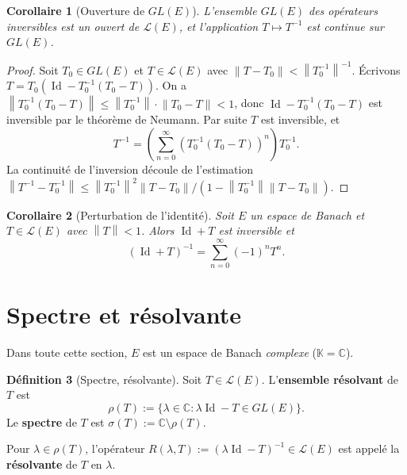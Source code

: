 \documentclass[a4paper,12pt]{book}
\DeclareMathOperator{\Id}{Id}
\newcommand{\C}{\mathbb{C}}
\newcommand{\K}{\mathbb{K}}
\newcommand{\norm}[1]{\left\| #1 \right\|}
\theoremstyle{definition}
\newtheorem{definition}{Définition}[chapter]
\theoremstyle{plain}
\newtheorem{corollaire}[definition]{Corollaire}
\theoremstyle{remark}
\begin{document}
\begin{corollaire}[Ouverture de $GL(E)$]\label{cor:GL-ouvert}
L'ensemble $GL(E)$ des opérateurs inversibles est un ouvert de $\mathcal{L}(E)$, et
l'application $T \mapsto T^{-1}$ est continue sur $GL(E)$.
\end{corollaire}

\begin{proof}
Soit $T_0 \in GL(E)$ et $T \in \mathcal{L}(E)$ avec
$\norm{T - T_0} < \norm{T_0^{-1}}^{-1}$. Écrivons
$T = T_0(\Id - T_0^{-1}(T_0 - T))$.
On a $\norm{T_0^{-1}(T_0 - T)} \leq \norm{T_0^{-1}}\cdot\norm{T_0 - T} < 1$,
donc $\Id - T_0^{-1}(T_0 - T)$ est inversible par le théorème de Neumann. Par suite
$T$ est inversible, et
\[
    T^{-1} = \left(\sum_{n=0}^{\infty} (T_0^{-1}(T_0 - T))^n\right) T_0^{-1}.
\]
La continuité de l'inversion découle de l'estimation
$\norm{T^{-1} - T_0^{-1}} \leq \norm{T_0^{-1}}^2 \norm{T - T_0} / (1 -
\norm{T_0^{-1}}\norm{T-T_0})$.
\end{proof}

\begin{corollaire}[Perturbation de l'identité]\label{cor:perturbation-id}
Soit $E$ un espace de Banach et $T \in \mathcal{L}(E)$ avec $\norm{T} < 1$. Alors
$\Id + T$ est inversible et
\[
    (\Id + T)^{-1} = \sum_{n=0}^{\infty} (-1)^n T^n.
\]
\end{corollaire}


\section{Spectre et résolvante}
\label{sec:spectre-resolvante}


Dans toute cette section, $E$ est un espace de Banach \emph{complexe}
($\K = \C$).

\begin{definition}[Spectre, résolvante]\label{def:spectre}
Soit $T \in \mathcal{L}(E)$. L'\textbf{ensemble résolvant}
de $T$ est
\[
    \rho(T) := \{\lambda \in \C : \lambda\Id - T \in GL(E)\}.
\]
Le \textbf{spectre} de $T$ est $\sigma(T) := \C \setminus \rho(T)$.

Pour $\lambda \in \rho(T)$, l'opérateur
$R(\lambda, T) := (\lambda\Id - T)^{-1} \in \mathcal{L}(E)$
est appelé la \textbf{résolvante} de $T$ en $\lambda$.
\end{definition}
\end{document}
